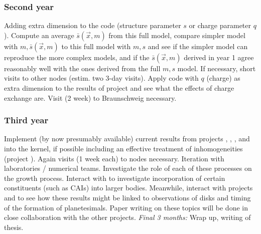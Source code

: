 \subsubsection{Second year}
Adding extra dimension to the code (structure parameter $s$ or charge
parameter $q$). Compute an average $\bar s(\vec x,m)$ from this full model,
compare simpler model with $m,\bar s(\vec x,m)$ to this full model with
$m,s$ and see if the simpler model can reproduce the more complex models,
and if the $\bar s(\vec x,m)$ derived in year 1 agree reasonably well with
the ones derived from the full $m,s$ model. If necessary, short visits to
other nodes (estim. two 3-day visits). Apply code with $q$ (charge) as extra
dimension to the results of project \projblum{} and see what the effects of
charge exchange are. Visit (2 week) to Braunschweig necessary.



\subsubsection{Third year}
Implement (by now presumably available) current results from projects
\projblum{}, \projwurm{}, \projblumtrie{}, \projkley{} and \projklahr{} into
the kernel, if possible including an effective treatment of inhomogeneities
(project \projklahr{}). Again visits (1 week each) to nodes
necessary. Iteration with laboratories / numerical teams. Investigate the
role of each of these processes on the growth process. Interact with
\projtscharn{} to investigate incorporation of certain constituents (such
as CAIs) into larger bodies. Meanwhile, interact with projects \projwolf{}
and \projtrie{} to see how these results might be linked to observations of
disks and timing of the formation of planetesimals. Paper writing on these
topics will be done in close collaboration with the other projects. {\em
Final 3 months:} Wrap up, writing of thesis.




